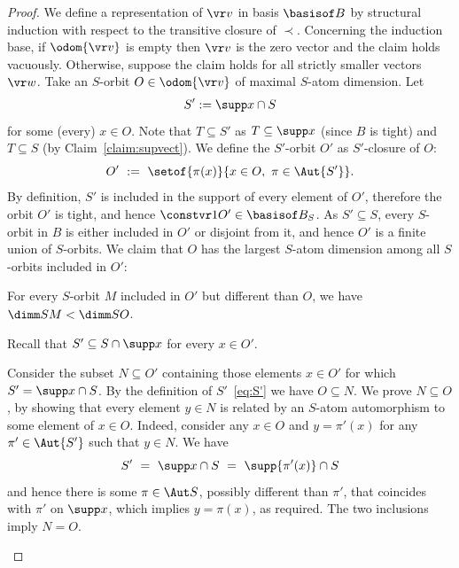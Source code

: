 \begin{proof}
We define a representation of $\vr v$ in basis $\basisof B$  
by structural induction with respect to the transitive closure of $\prec$.
Concerning the induction base, if $\odom {\vr v}$ is empty
then $\vr v$ is the zero vector and the claim holds vacuously.
Otherwise, suppose the claim holds for all strictly smaller vectors $\vr w$.
Take an $S$-orbit $O\in\odom{\vr v}$ of maximal $S$-atom dimension. %
Let 
\begin{align}\label{eq:S'}
S' := \supp x \cap S
\end{align}
for some (every) $x\in O$.
Note that $T\subseteq S'$ as $T\subseteq \supp x$ (since $B$ is tight) and $T\subseteq S$
(by Claim~\ref{claim:supvect}).
We define the $S'$-orbit $O'$ as $S'$-closure of $O$:
\[
O' \ := \ \setof{\pi(x)}{x\in O, \ \pi \in\Aut {S'}}.
\]
By definition, $S'$ is included in the support of every element of $O'$, therefore the orbit $O'$ is tight,
and hence $\constvr 1 {O'}\in \basisof B_S$.
%
As $S'\subseteq S$, every $S$-orbit in $B$ is either included in $O'$ or disjoint from it, and hence
$O'$ is a finite union of $S$-orbits.
We claim that $O$ has the largest $S$-atom dimension among all $S$-orbits included in $O'$:
%
\begin{claim} \label{claim:ind}
For every $S$-orbit $M$ included in $O'$ but different than $O$,
we have $\dimm S M < \dimm S O$.
\end{claim}
%
\begin{claimproof}
Recall that $S'\subseteq S\cap \supp x$ for every $x\in O'$.

Consider the subset $N\subseteq O'$ containing those
elements $x\in O'$ for which $S' = \supp x \cap S$.
By the definition of $S'$~\eqref{eq:S'} we have $O\subseteq N$. 
We prove $N\subseteq O$, by showing that
every element $y \in N$ is related by an $S$-atom automorphism to some element of $x\in O$.
Indeed, consider any $x\in O$ and $y = \pi'(x)$ for any $\pi'\in \Aut {S'}$ such that $y \in N$. We have
\[
S' \ = \ \supp x \cap S \ = \ \supp {\pi'(x)} \cap S
\]
and hence there is some $\pi\in \Aut S$, possibly different than $\pi'$, that coincides with $\pi'$ on $\supp x$,
which implies $y = \pi(x)$, as required.
The two inclusions imply $N=O$.


\end{claimproof}
\end{proof}

